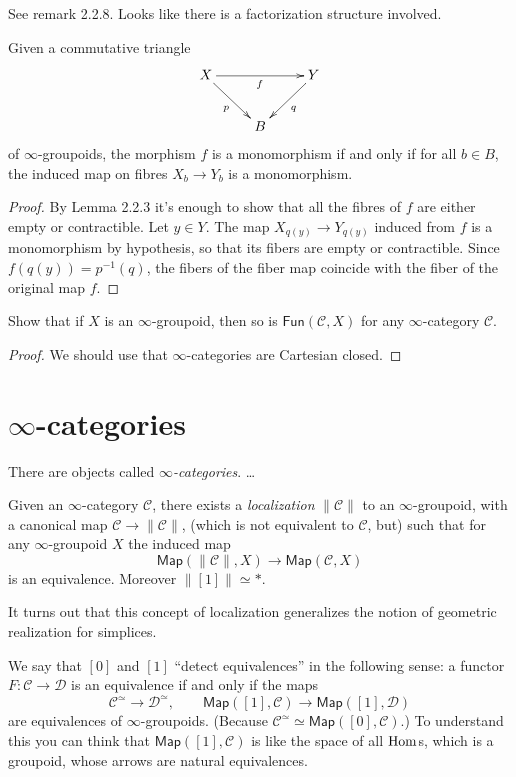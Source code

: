 \noindent
See remark 2.2.8. Looks like there
is a factorization structure involved.

\begin{exercise}[2.8]
\label{exercise-2.8}
Given a commutative triangle
$$
\xymatrix{
X \ar[rd]_{p} \ar[rr]_{f} && Y \ar[dl]^{q} \\
& B
}
$$
of $\infty$-groupoids, the morphism $f$ is a monomorphism
if and only if for all $b \in B$, the
induced map on fibres $X_b \to Y_b$ is a monomorphism.
\end{exercise}

\begin{proof}
By Lemma 2.2.3 it's enough to show that all the fibres of
$f$ are either empty or contractible.
Let $y \in Y$. The map $X_{q(y)}\to Y_{q(y)}$ induced from $f$ 
is a monomorphism by hypothesis, so that its fibers
are empty or contractible. Since $f(q(y))=p^{-1}(q)$,
the fibers of the fiber map coincide with the fiber of the 
original map $f$.
\end{proof}

\begin{exercise}[2.9]
\label{exercise-2.9}
Show that if $X$ is an $\infty$-groupoid,
then so is $\mathsf{Fun}(\mathcal{C},X)$ 
for any $\infty$-category $\mathcal{C}$.
\end{exercise}

\begin{proof}
We should use that
$\infty$-categories are Cartesian closed.
\end{proof}

\section{$\infty$-categories}
\label{section-infty-categories}

\noindent
There are objects called {\it $\infty$-categories}. …

\medskip\noindent
Given an $\infty$-category $\mathcal{C}$, there exists
a {\it localization} $\|\mathcal{C}\|$ to an
$\infty$-groupoid, with a canonical map
$\mathcal{C} \to \|\mathcal{C}\|$,
(which is not equivalent to $\mathcal{C}$, but)
such that for any $\infty$-groupoid $X$ 
the induced map
$$
\mathsf{Map}(\|\mathcal{C}\|,X) \to \mathsf{Map}(\mathcal{C},X)
$$
is an equivalence.
Moreover  $\|[1]\|\simeq *$.

It turns out that this concept of localization
generalizes the notion of geometric realization
for simplices.

\medskip\noindent
We say that $[0]$ and $[1]$ ``detect equivalences''
in the following sense:
a functor $F: \mathcal{C} \to \mathcal{D}$ is
an equivalence if and only if the maps
$$
\mathcal{C}^{\simeq} \to \mathcal{D}^{\simeq},\qquad 
\mathsf{Map}([1],\mathcal{C})\to\mathsf{Map}([1],\mathcal{D})
$$
are equivalences of $\infty$-groupoids.
(Because $\mathcal{C}^\simeq \simeq \mathsf{Map}([0], \mathcal{C})$.)
To understand this you can think that
$\mathsf{Map}([1],\mathcal{C})$ is like
the space of all $\mathop{\mathrm{Hom}}\nolimits$s, which is a groupoid,
whose arrows are natural equivalences.


